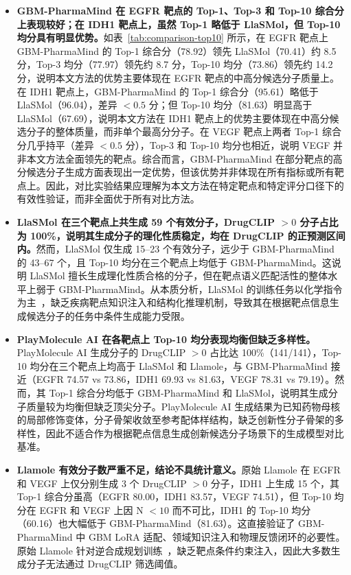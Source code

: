 \begin{itemize}
    \setlength{\itemsep}{0.2em}
    \item \textbf{GBM-PharmaMind 在 EGFR 靶点的 Top-1、Top-3 和 Top-10 综合分上表现较好；在 IDH1 靶点上，虽然 Top-1 略低于 LlaSMol，但 Top-10 均分具有明显优势。}如表~\ref{tab:comparison-top10} 所示，在 EGFR 靶点上 GBM-PharmaMind 的 Top-1 综合分（78.92）领先 LlaSMol（70.41）约 8.5 分，Top-3 均分（77.97）领先约 8.7 分，Top-10 均分（73.86）领先约 14.2 分，说明本文方法的优势主要体现在 EGFR 靶点的中高分候选分子质量上。在 IDH1 靶点上，GBM-PharmaMind 的 Top-1 综合分（95.61）略低于 LlaSMol（96.04），差异 $< 0.5$ 分；但 Top-10 均分（81.63）明显高于 LlaSMol（67.69），说明本文方法在 IDH1 靶点上的优势主要体现在中高分候选分子的整体质量，而非单个最高分分子。在 VEGF 靶点上两者 Top-1 综合分几乎持平（差异 $< 0.5$ 分），Top-3 和 Top-10 均分也相近，说明 VEGF 并非本文方法全面领先的靶点。综合而言，GBM-PharmaMind 在部分靶点的高分候选分子生成方面表现出一定优势，但该优势并非体现在所有指标或所有靶点上。因此，对比实验结果应理解为本文方法在特定靶点和特定评分口径下的有效性验证，而非全面优于所有对比方法。

    \item \textbf{LlaSMol 在三个靶点上共生成 59 个有效分子，DrugCLIP $> 0$ 分子占比为 100\%，说明其生成分子的理化性质稳定，均在 DrugCLIP 的正预测区间内。}然而，LlaSMol 仅生成 15--23 个有效分子，远少于 GBM-PharmaMind 的 43--67 个，且 Top-10 均分在三个靶点上均低于 GBM-PharmaMind。这说明 LlaSMol 擅长生成理化性质合格的分子，但在靶点语义匹配活性的整体水平上弱于 GBM-PharmaMind。从本质分析，LlaSMol 的训练任务以化学指令为主~\cite{Yu2024}，缺乏疾病靶点知识注入和结构化推理机制，导致其在根据靶点信息生成候选分子的任务中条件生成能力受限。

    \item \textbf{PlayMolecule AI 在各靶点上 Top-10 均分表现均衡但缺乏多样性。}PlayMolecule AI 生成分子的 DrugCLIP $> 0$ 占比达 100\%（141/141），Top-10 均分在三个靶点上均高于 LlaSMol 和 Llamole，与 GBM-PharmaMind 接近（EGFR 74.57 vs 73.86，IDH1 69.93 vs 81.63，VEGF 78.31 vs 79.19）。然而，其 Top-1 综合分均低于 GBM-PharmaMind 和 LlaSMol，说明其生成分子质量较为均衡但缺乏顶尖分子。PlayMolecule AI 生成结果为已知药物母核的局部修饰变体，分子骨架收敛至参考配体样结构，缺乏创新性分子骨架的多样性，因此不适合作为根据靶点信息生成创新候选分子场景下的生成模型对比基准。

    \item \textbf{Llamole 有效分子数严重不足，结论不具统计意义。}原始 Llamole 在 EGFR 和 VEGF 上仅分别生成 3 个 DrugCLIP $> 0$ 分子，IDH1 上生成 15 个，其 Top-1 综合分虽高（EGFR 80.00，IDH1 83.57，VEGF 74.51），但 Top-10 均分在 EGFR 和 VEGF 上因 N $< 10$ 而不可比，IDH1 的 Top-10 均分（60.16）也大幅低于 GBM-PharmaMind（81.63）。这直接验证了 GBM-PharmaMind 中 GBM LoRA 适配、领域知识注入和物理反馈闭环的必要性。原始 Llamole 针对逆合成规划训练~\cite{liu2025multimodal}，缺乏靶点条件约束注入，因此大多数生成分子无法通过 DrugCLIP 筛选阈值。


\end{itemize}
